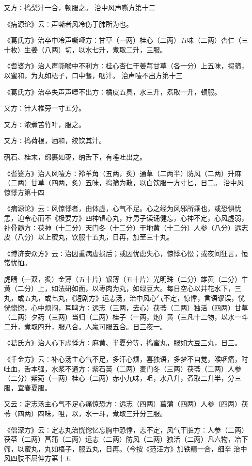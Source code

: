 \documentclass[a4paper,12pt,UTF8,twoside]{ctexbook}
\begin{document}
又方∶捣梨汁一合，顿服之。
治中风声嘶方第十二

《病源论》云∶声嘶者风冷伤于肺所为也。

《葛氏方》治卒中冷声嘶哑方∶甘草（一两）桂心（二两）五味（二两）杏仁（三十枚）生姜（八两）切，以水七升，煮取二升，三服。

《耆婆方》治人声嘶喉中不利方∶桂心杏仁干姜芎甘草（各一分）上五味，捣筛，以蜜和，为丸如梧子，口中餐，咽汁。
治声噎不出方第十三

《葛氏方》治卒失声声噎不出方∶橘皮五具，水三升，煮取一升，顿服。

又方∶针大椎旁一寸五分。

又方∶浓煮苦竹叶，服之。

又方∶捣荷根，酒和，绞饮其汁。

矾石、桂末，绵裹如枣，纳舌下，有唾吐出之。

《耆婆方》治人风噎方∶羚羊角（五两，炙）通草（二两半）防风（二两）升麻（二两）甘草（四两，炙）五味，捣筛为散，以白饮服一方寸匕，日二。
治中风惊悸方第十四

《病源论》云∶风惊悸者，由体虚，心气不足。心之经为风邪所乘也，或恐惧忧恚，迫令心而不《极要方》四神镇心丸，疗男子读诵健忘，心神不定，心风虚弱，补骨髓方∶茯神（十二分）天门冬（十二分）干地黄（十二分）人参（八分）远志皮（八分）以上蜜丸，饮服十五丸，日再，加至三十丸。

《博济安众方》云∶治因重病虚损后；或因忧虑失心，惊悸心忪；或夜间狂言，恒常忧怕。

虎睛（一双，炙）金薄（五十片）银薄（五十片）光明珠（二分）雄黄（二分）牛黄（二分）上，如法研如面，以枣肉为丸，如绿豆大。每日空心以井花水下，三丸，或五丸，或七丸，《短剧方》远志汤，治中风心气不定，惊悸，言语谬误，恍恍惚惚，心中烦闷，耳鸣方∶远志（三两，去心）茯苓（二两）独活（四两）甘草（二两）夕药（三两）当归（二两）桂子（一两，炮）黄（三凡十二物，以水一斗二升，煮取四升，服八合。人羸可服五合。日三夜一。

《葛氏方》治人心下虚悸方∶麻黄、半夏分等，捣蜜丸，服如大豆三丸，日三。

《千金方》云∶补心汤主心气不足，多汗心烦，喜独语，多梦不自觉，喉咽痛，时吐血，舌本强，水浆不通方∶紫石英（二两）麦门冬（三两）茯苓（二两）人参（二分）紫菀（一两）桂心（二两）赤小九味，咀，水八升，煮取二升半，分三服，宜春夏服。

又云∶定志汤主心气不足心痛惊恐方∶远志（四两）菖蒲（四两）人参（四两）茯苓（四两）四味，咀，以，水一斗，煮取三升分三服。

《僧深方》云∶定志丸治恍惚忆忘胸中恐悸，志不定，风气干脏方∶人参（二两）茯苓（二两）菖蒲（二两）远志（二两）防风（二两）独活（二两）凡六物，冶下筛，以蜜丸，丸如梧子，服五丸，日再。（今按《范汪方》加铁精一合，细辛
治中风四肢不屈伸方第十五
\end{document}
